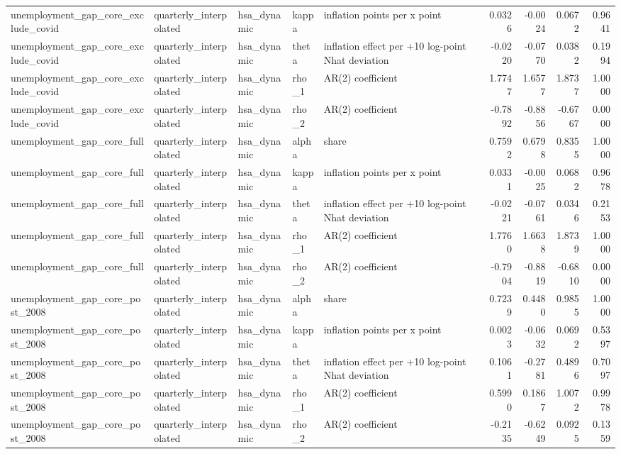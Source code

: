 \begin{tabular}{lllllrrrr}
unemployment\_gap\_core\_exclude\_covid & quarterly\_interpolated & hsa\_dynamic & kappa & inflation points per x point & 0.0326 & -0.0024 & 0.0672 & 0.9641 \\
unemployment\_gap\_core\_exclude\_covid & quarterly\_interpolated & hsa\_dynamic & theta & inflation effect per +10 log-point Nhat deviation & -0.0220 & -0.0770 & 0.0382 & 0.1994 \\
unemployment\_gap\_core\_exclude\_covid & quarterly\_interpolated & hsa\_dynamic & rho\_1 & AR(2) coefficient & 1.7747 & 1.6577 & 1.8737 & 1.0000 \\
unemployment\_gap\_core\_exclude\_covid & quarterly\_interpolated & hsa\_dynamic & rho\_2 & AR(2) coefficient & -0.7892 & -0.8856 & -0.6767 & 0.0000 \\
unemployment\_gap\_core\_full & quarterly\_interpolated & hsa\_dynamic & alpha & share & 0.7592 & 0.6798 & 0.8355 & 1.0000 \\
unemployment\_gap\_core\_full & quarterly\_interpolated & hsa\_dynamic & kappa & inflation points per x point & 0.0331 & -0.0025 & 0.0682 & 0.9678 \\
unemployment\_gap\_core\_full & quarterly\_interpolated & hsa\_dynamic & theta & inflation effect per +10 log-point Nhat deviation & -0.0221 & -0.0761 & 0.0346 & 0.2153 \\
unemployment\_gap\_core\_full & quarterly\_interpolated & hsa\_dynamic & rho\_1 & AR(2) coefficient & 1.7760 & 1.6638 & 1.8739 & 1.0000 \\
unemployment\_gap\_core\_full & quarterly\_interpolated & hsa\_dynamic & rho\_2 & AR(2) coefficient & -0.7904 & -0.8819 & -0.6810 & 0.0000 \\
unemployment\_gap\_core\_post\_2008 & quarterly\_interpolated & hsa\_dynamic & alpha & share & 0.7239 & 0.4480 & 0.9855 & 1.0000 \\
unemployment\_gap\_core\_post\_2008 & quarterly\_interpolated & hsa\_dynamic & kappa & inflation points per x point & 0.0023 & -0.0632 & 0.0692 & 0.5397 \\
unemployment\_gap\_core\_post\_2008 & quarterly\_interpolated & hsa\_dynamic & theta & inflation effect per +10 log-point Nhat deviation & 0.1061 & -0.2781 & 0.4896 & 0.7097 \\
unemployment\_gap\_core\_post\_2008 & quarterly\_interpolated & hsa\_dynamic & rho\_1 & AR(2) coefficient & 0.5990 & 0.1867 & 1.0072 & 0.9978 \\
unemployment\_gap\_core\_post\_2008 & quarterly\_interpolated & hsa\_dynamic & rho\_2 & AR(2) coefficient & -0.2135 & -0.6249 & 0.0925 & 0.1359 \\

\end{tabular}

